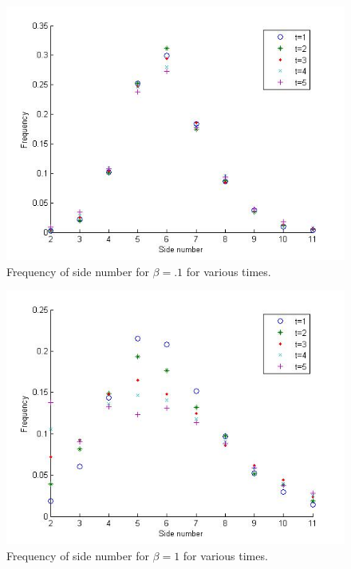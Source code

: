 \begin{figure}
        \begin{centering}
        \includegraphics[width=.5\textwidth]{classdisttenth.jpg}
        \caption{Frequency of side number for $\beta= .1$ for various times.}
\end{centering}
\end{figure}

\begin{figure}
        \begin{centering}
        \includegraphics[width=.5\textwidth]{classdistone.jpg}
        \caption{Frequency of side number for $\beta= 1$ for various times.}\label{sidedist3}
\end{centering}
\end{figure}
        
        
        
        

 




       
        
        
        





        
        
       


